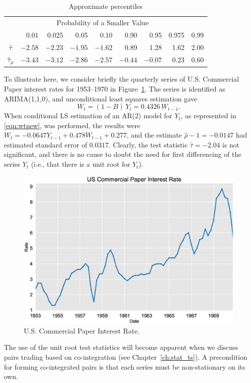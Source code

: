 	\begin{table}[!ht]
	\centering
	\caption{Approximate percentiles \label{tab:percentiles}}
	\begin{tabular}{crrrrrrrr}
	& \multicolumn{7}{c}{Probability of a Smaller Value} \\
	& 0.01 & 0.025 & 0.05 & 0.10 & 0.90 & 0.95 & 0.975 & 0.99 \\ \hline
	$\hat{\tau}$ & $-2.58$ & $-2.23$ & $-1.95$ & $-1.62$  &0.89 & 1.28 & 1.62 & 2.00 \\
	$\hat{\tau}_\mu$ & $-3.43$ & $-3.12$ & $-2.86$ & $-2.57$ & $-0.44$ & $-0.07$ & 0.23 & 0.60
	\end{tabular}
	\end{table}


\begin{ex} 
To illustrate here, we consider briefly the quarterly series of U.S. Commercial Paper interest rates for 1953--1970 in Figure~\ref{fig:exchratefirst}. The series is identified as ARIMA(1,1,0), and unconditional least squares estimation gave 
	\[
	W_t = (1 - B)\, Y_t = 0.4326\, W_{t-1}.
	\]
When conditional LS estimation of an AR(2) model for $Y_t$, as represented in \eqref{eqn:wtnew}, was performed, the results were $W_t = -0.0647Y_{t-1} + 0.478 W_{t-1} + 0.277$, and the estimate $\hat{\rho} - 1 = -0.0147$ had estimated standard error of $0.0317$. Clearly, the test statistic $\hat{\tau} = -2.04$ is not significant, and there is no cause to doubt the need for first differencing of the series $Y_t$ (i.e., that there is a unit root for $Y_t$).
	\begin{figure}[!ht]
	\centering
	\includegraphics[width=\textwidth]{chapters/chapter_uvts/figures/uscompaper.eps}
	\caption{U.S. Commercial Paper Interest Rate.\label{fig:exchratefirst}}
	\end{figure}
The use of the unit root test statistics will become apparent when we discuss pairs trading based on co-integration (see Chapter~\ref{ch:stat_ts}). A precondition for forming co-integrated pairs is that each series must be non-stationary on its own. \xqed
\end{ex}



